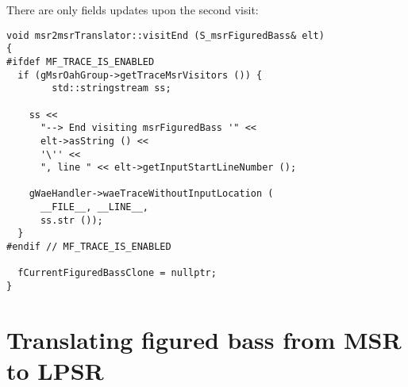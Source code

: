 There are only fields updates upon the second visit:
\begin{lstlisting}[language=CPlusPlus]
void msr2msrTranslator::visitEnd (S_msrFiguredBass& elt)
{
#ifdef MF_TRACE_IS_ENABLED
  if (gMsrOahGroup->getTraceMsrVisitors ()) {
		std::stringstream ss;

    ss <<
      "--> End visiting msrFiguredBass '" <<
      elt->asString () <<
      '\'' <<
      ", line " << elt->getInputStartLineNumber ();

    gWaeHandler->waeTraceWithoutInputLocation (
      __FILE__, __LINE__,
      ss.str ());
  }
#endif // MF_TRACE_IS_ENABLED

  fCurrentFiguredBassClone = nullptr;
}
\end{lstlisting}


\section{Translating figured bass from MSR to LPSR}

